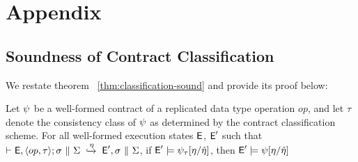 \section{Appendix}
\label{sec:appendix}

\subsection{Soundness of Contract Classification}

We restate theorem ~\ref{thm:classification-sound} and provide its proof
below:

\begin{theorem}
\label{lem:classification-sound}
Let $\psi$ be a well-formed contract of a replicated data type
operation $\mathit{op}$, and let $\tau$ denote the consistency class
of $\psi$ as determined by the contract classification scheme. For all
well-formed execution states ${\normalfont \textsf{E}}$, ${\normalfont \textsf{E}}'$ such that $\vdash {\normalfont \textsf{E}},\langle op,\tau \rangle;\sigma ~\|~ \Sigma \;\xhookrightarrow{\eta}\; {\normalfont \textsf{E}}', \sigma
~\|~ \Sigma$, if ${\normalfont \textsf{E}}' \models \psi_\tau[\eta/\hat{\eta}]$, then ${\normalfont \textsf{E}}'
\models \psi[\eta/\hat{\eta}]$
\end{theorem}
